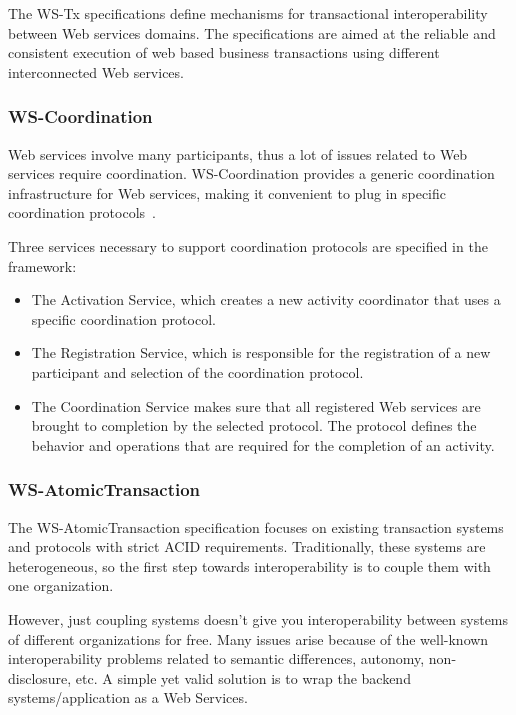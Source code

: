 \documentclass{sig-alternate-05-2015}
\begin{document}
The WS-Tx specifications define mechanisms for transactional
interoperability between Web services domains. The specifications are
aimed at the reliable and consistent execution of web based business
transactions using different interconnected Web services.

\subsubsection{WS-Coordination}
\label{sec:wsc}

Web services involve many participants, thus a lot of issues related
to Web services require coordination. WS-Coordination provides a
generic coordination infrastructure for Web services, making it
convenient to plug in specific coordination
protocols~\cite{little2003introducing}.

Three services necessary to support coordination protocols are
specified in the framework:

\begin{itemize}
\item The Activation Service, which creates a new activity coordinator
  that uses a specific coordination protocol.
\item The Registration Service, which is responsible for the
  registration of a new participant and selection of the coordination
  protocol.
\item The Coordination Service makes sure that all registered Web
  services are brought to completion by the selected protocol. The
  protocol defines the behavior and operations that are required for
  the completion of an activity.
\end{itemize}


\subsubsection{WS-AtomicTransaction}
\label{sec:wsat}

The WS-AtomicTransaction specification focuses on existing transaction
systems and protocols with strict ACID requirements. Traditionally,
these systems are heterogeneous, so the first step towards
interoperability is to couple them with one organization. 

However, just coupling systems doesn't give you interoperability
between systems of different organizations for free. Many issues arise
because of the well-known interoperability problems related to
semantic differences, autonomy, non-disclosure, etc. A simple yet
valid solution is to wrap the backend systems/application as a Web
Services.
\end{document}
